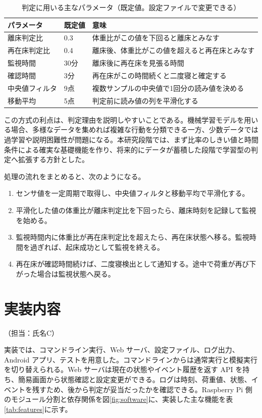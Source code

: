 \documentclass[paper=a4,fontsize=10pt,ja=standard,lualatex]{jlreq}
\newcommand{\AuthorNote}[1]{\hfill{\small （担当：#1）}}
\begin{document}
\begin{table}[h]
\centering
\caption{判定に用いる主なパラメータ（既定値。設定ファイルで変更できる）}
\label{tab:params}
\begin{tabularx}{0.95\linewidth}{llY}
\toprule
パラメータ & 既定値 & 意味\\
\midrule
離床判定比 & 0.3 & 体重比がこの値を下回ると離床とみなす\\
再在床判定比 & 0.4 & 離床後、体重比がこの値を超えると再在床とみなす\\
監視時間 & 30分 & 離床後に再在床を見張る時間\\
確認時間 & 3分 & 再在床がこの時間続くと二度寝と確定する\\
中央値フィルタ & 9点 & 複数サンプルの中央値で1回分の読み値を決める\\
移動平均 & 5点 & 判定前に読み値の列を平滑化する\\
\bottomrule
\end{tabularx}
\end{table}

この方式の利点は、判定理由を説明しやすいことである。機械学習モデルを用いる場合、多様なデータを集めれば複雑な行動を分類できる一方、少数データでは過学習や説明困難性が問題になる。本研究段階では、まず比率のしきい値と時間条件による確実な基礎機能を作り、将来的にデータが蓄積した段階で学習型の判定へ拡張する方針とした。

処理の流れをまとめると、次のようになる。

\begin{enumerate}
  \item センサ値を一定周期で取得し、中央値フィルタと移動平均で平滑化する。
  \item 平滑化した値の体重比が離床判定比を下回ったら、離床時刻を記録して監視を始める。
  \item 監視時間内に体重比が再在床判定比を超えたら、再在床状態へ移る。監視時間を過ぎれば、起床成功として監視を終える。
  \item 再在床が確認時間続けば、二度寝検出として通知する。途中で荷重が再び下がった場合は監視状態へ戻る。
\end{enumerate}

\section{実装内容}
\label{sec:implementation}
\AuthorNote{氏名C}

実装では、コマンドライン実行、Web サーバ、設定ファイル、ログ出力、Android アプリ、テストを用意した。コマンドラインからは通常実行と模擬実行を切り替えられる。Web サーバは現在の状態やイベント履歴を返す API を持ち、簡易画面から状態確認と設定変更ができる。ログは時刻、荷重値、状態、イベントを残すため、後から判定が妥当だったかを確認できる。Raspberry Pi 側のモジュール分割と依存関係を図\ref{fig:software}に、実装した主な機能を表\ref{tab:features}に示す。
\end{document}
